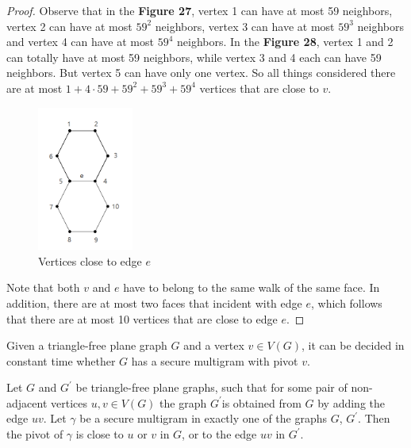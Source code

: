 \begin{proof}
    Observe that in the \textbf{Figure 27}, vertex 1 can have at most 59 neighbors, vertex 2 can have at most $59^{2}$ neighbors, vertex 3 can have at most $59^{3}$ neighbors and vertex 4 can have at most $59^{4}$ neighbors. In the \textbf{Figure 28}, vertex 1 and 2 can totally have at most 59 neighbors, while vertex 3 and 4 each can have 59 neighbors. But vertex 5 can have only one vertex. So all things considered there are at most $1 + 4 \cdot 59 + 59^{2} + 59^{3} + 59^{4}$ vertices that are close to $v$.
    \begin{figure}[H] %
    \centering %
    \includegraphics[width=0.28\textwidth]{figure/593.png} 
    \caption{Vertices close to edge $e$} %
    \label{figure} %
    \end{figure}
    Note that both $v$ and $e$ have to belong to the same walk of the same face. In addition, there are at most two faces that incident with edge $e$, which follows that there are at most 10 vertices that are close to edge $e$.
\end{proof}

\begin{lemma}
Given a triangle-free plane graph $G$ and a vertex $v \in V(G)$, it can be decided in constant time whether $G$ has a secure multigram with pivot $v$. \cite{dvorak2013threecoloring}
\end{lemma}

\begin{lemma}
Let $G$ and $G^{'}$ be triangle-free plane graphs, such that for some pair of non-adjacent vertices $u, v \in V(G)$ the graph $G^{'}$is obtained from $G$ by adding the edge $uv$. Let $\gamma$ be a secure multigram in exactly one of the graphs $G$, $G^{'}$. Then the pivot of $\gamma$ is close to $u$ or $v$ in $G$, or to the edge $uv$ in $G^{'}$. \cite{dvorak2013threecoloring}
\end{lemma}

